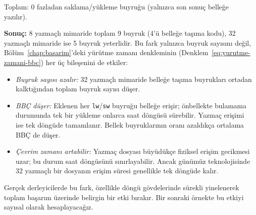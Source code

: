 \begin{ornek}[3.3]
Toplam: 0 fazladan saklama/yükleme buyruğu (yalnızca son sonuç belleğe yazılır).

\medskip
\textbf{Sonuç:} 8 yazmaçlı mimaride toplam 9 buyruk (4'ü belleğe taşıma kodu), 32 yazmaçlı mimaride ise 5 buyruk yeterlidir. Bu fark yalnızca buyruk sayısını değil, Bölüm~\ref{chap:basarim}'deki yürütme zamanı denkleminin (Denklem~\ref{eq:yurutme-zamani-bbc}) her üç bileşenini de etkiler:

\begin{itemize}[nosep]
\item \emph{Buyruk sayısı azalır:} 32 yazmaçlı mimaride belleğe taşıma buyrukları ortadan kalktığından toplam buyruk sayısı düşer.
\item \emph{BBÇ düşer:} Eklenen her \texttt{lw}/\texttt{sw} buyruğu belleğe erişir; önbellekte bulamama durumunda tek bir yükleme onlarca saat döngüsü sürebilir. Yazmaç erişimi ise tek döngüde tamamlanır. Bellek buyruklarının oranı azaldıkça ortalama BBÇ de düşer.
\item \emph{Çevrim zamanı artabilir:} Yazmaç dosyası büyüdükçe fiziksel erişim gecikmesi uzar; bu durum saat döngüsünü sınırlayabilir. Ancak günümüz teknolojisinde 32 yazmaçlı bir dosyanın erişim süresi genellikle tek döngüde kalır.
\end{itemize}

Gerçek derleyicilerde bu fark, özellikle döngü gövdelerinde sürekli yinelenerek toplam başarım üzerinde belirgin bir etki bırakır. Bir sonraki örnekte bu etkiyi sayısal olarak hesaplayacağız.
\end{ornek}

